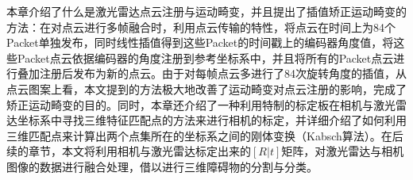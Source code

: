 本章介绍了什么是激光雷达点云注册与运动畸变，并且提出了插值矫正运动畸变的方法：在对点云进行多帧融合时，利用点云传输的特性，将点云在时间上为84个Packet单独发布，同时线性插值得到这些Packet的时间戳上的编码器角度值，将这些Packet点云依据编码器的角度注册到参考坐标系中，并且将所有的Packet点云进行叠加注册后发布为新的点云。由于对每帧点云多进行了84次旋转角度的插值，从点云图案上看，本文提到的方法极大地改善了运动畸变对点云注册的影响，完成了矫正运动畸变的目的。同时，本章还介绍了一种利用特制的标定板在相机与激光雷达坐标系中寻找三维特征匹配点的方法来进行相机的标定，并详细介绍了如何利用三维匹配点来计算出两个点集所在的坐标系之间的刚体变换（Kabsch算法）。在后续的章节，本文将利用相机与激光雷达标定出来的$[R|t]$矩阵，对激光雷达与相机图像的数据进行融合处理，借以进行三维障碍物的分割与分类。